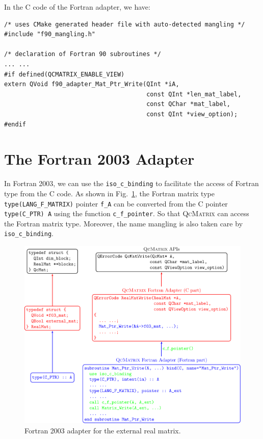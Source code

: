\documentclass[a4paper,11pt,twoside,openright]{book}
\begin{document}
In the C code of the Fortran adapter, we have:
\begin{verbatim}
/* uses CMake generated header file with auto-detected mangling */
#include "f90_mangling.h"

/* declaration of Fortran 90 subroutines */
... ...
#if defined(QCMATRIX_ENABLE_VIEW)
extern QVoid f90_adapter_Mat_Ptr_Write(QInt *iA,
                                       const QInt *len_mat_label,
                                       const QChar *mat_label,
                                       const QInt *view_option);
#endif
\end{verbatim}

\section{The Fortran 2003 Adapter}
\label{section-F03-adapter}

In Fortran 2003, we can use the \verb|iso_c_binding| to facilitate the
access of Fortran type from the C code. As shown in Fig.~\ref{fig-F03-adapter-type},
the Fortran matrix type \verb|type(LANG_F_MATRIX)| pointer \verb|f_A|
can be converted from the C pointer \verb|type(C_PTR) A| using the function
\verb|c_f_pointer|. So that \textsc{QcMatrix} can access the Fortran matrix
type. Moreover, the name mangling is also taken care by \verb|iso_c_binding|.
\begin{figure}[hbtp]
  \centering
  \includegraphics[width=16cm]{F03_adapter_type.pdf}
  \caption{Fortran 2003 adapter for the external real matrix.}
  \label{fig-F03-adapter-type}
\end{figure}
\end{document}
